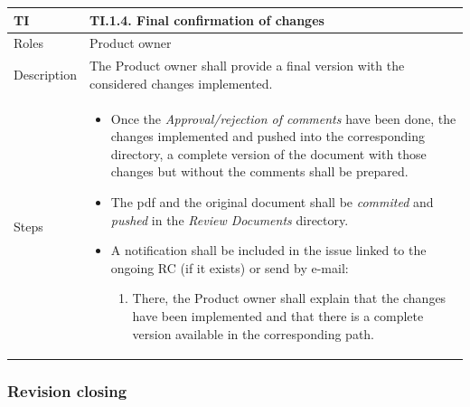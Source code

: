 \documentclass{template/openetcs_article}
\begin{document}
\begin{flushleft}
\tablefirsthead{}
\tablehead{}
\tabletail{}
\tablelasttail{}
\begin{supertabular}{|m{2cm}|m{13cm}|}
\hline
{}
TI & 
TI.1.4. Final confirmation of changes
\\\hline
Roles &
Product owner
\\\hline
Description &
The Product owner shall provide a final version with the considered changes implemented.  
\\\hline
Steps &
\begin{itemize}
\item Once the {\it Approval/rejection of comments} have been done, the changes implemented and pushed into the corresponding directory, a complete version of the document with those changes but without the comments shall be prepared.
\item The pdf and the original document shall be {\it commited} and {\it pushed} in the {\it Review Documents} directory.
\item A notification shall be included in the issue linked to the ongoing RC (if it exists) or send by e-mail: 
\begin{enumerate}
\item There, the Product owner shall explain that the changes have been implemented and that there is a complete version available in the corresponding path.
\end{enumerate}
\end{itemize}
\\\hline
\end{supertabular}
\end{flushleft}

\subsubsection{Revision closing}
\end{document}
